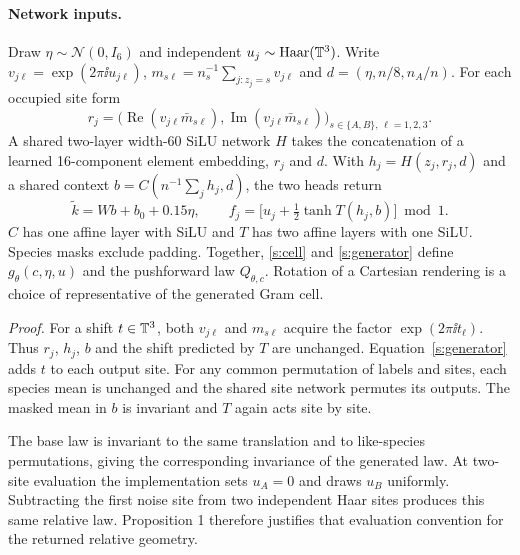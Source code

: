 \paragraph{Network inputs.}
Draw $\eta\sim\mathcal N(0,I_6)$ and independent $u_j\sim{\rm Haar}(\mathbb T^3)$. Write $v_{j\ell}=\exp(2\pi\ii u_{j\ell})$, $m_{s\ell}=n_s^{-1}\sum_{j:z_j=s}v_{j\ell}$ and $d=(\eta,n/8,n_A/n)$. For each occupied site form
\[
 r_j=\big(\operatorname{Re}(v_{j\ell}\bar m_{s\ell}),
          \operatorname{Im}(v_{j\ell}\bar m_{s\ell})\big)_{s\in\{A,B\},\,\ell=1,2,3}.
\]
A shared two-layer width-60 SiLU network $H$ takes the concatenation of a learned 16-component element embedding, $r_j$ and $d$. With $h_j=H(z_j,r_j,d)$ and a shared context $b=C(n^{-1}\sum_jh_j,d)$, the two heads return
\begin{equation}
 \tilde k=Wb+b_0+0.15\eta,\qquad
 f_j=\big[u_j+\tfrac12\tanh T(h_j,b)\big]\bmod1 .
 \label{s:generator}
\end{equation}
$C$ has one affine layer with SiLU and $T$ has two affine layers with one SiLU. Species masks exclude padding. Together, \eqref{s:cell} and \eqref{s:generator} define $g_\theta(c,\eta,u)$ and the pushforward law $Q_{\theta,c}$. Rotation of a Cartesian rendering is a choice of representative of the generated Gram cell.

\noindent\emph{Proof.}
For a shift $t\in\mathbb T^3$, both $v_{j\ell}$ and $m_{s\ell}$ acquire the factor $\exp(2\pi\ii t_\ell)$. Thus $r_j$, $h_j$, $b$ and the shift predicted by $T$ are unchanged. Equation~\eqref{s:generator} adds $t$ to each output site. For any common permutation of labels and sites, each species mean is unchanged and the shared site network permutes its outputs. The masked mean in $b$ is invariant and $T$ again acts site by site. \proofend

The base law is invariant to the same translation and to like-species permutations, giving the corresponding invariance of the generated law. At two-site evaluation the implementation sets $u_A=0$ and draws $u_B$ uniformly. Subtracting the first noise site from two independent Haar sites produces this same relative law. Proposition 1 therefore justifies that evaluation convention for the returned relative geometry.

